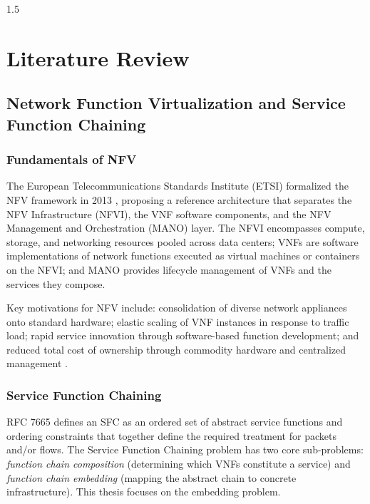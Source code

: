 \documentclass[A4paper,12pt]{report}
\theoremstyle{plain}
\theoremstyle{definition}
\theoremstyle{remark}
\numberwithin{equation}{section}
\begin{document}
\begin{spacing}{1.5}
\chapter{Literature Review}

\section{Network Function Virtualization and Service Function Chaining}

\subsection{Fundamentals of NFV}

The European Telecommunications Standards Institute (ETSI) formalized the NFV framework in 2013 \cite{etsi2013}, proposing a reference architecture that separates the NFV Infrastructure (NFVI), the VNF software components, and the NFV Management and Orchestration (MANO) layer. The NFVI encompasses compute, storage, and networking resources pooled across data centers; VNFs are software implementations of network functions executed as virtual machines or containers on the NFVI; and MANO provides lifecycle management of VNFs and the services they compose.

Key motivations for NFV include: consolidation of diverse network appliances onto standard hardware; elastic scaling of VNF instances in response to traffic load; rapid service innovation through software-based function development; and reduced total cost of ownership through commodity hardware and centralized management \cite{mijumbi2016}.

\subsection{Service Function Chaining}

RFC 7665 \cite{halpern2015} defines an SFC as an ordered set of abstract service functions and ordering constraints that together define the required treatment for packets and/or flows. The Service Function Chaining problem has two core sub-problems: \textit{function chain composition} (determining which VNFs constitute a service) and \textit{function chain embedding} (mapping the abstract chain to concrete infrastructure). This thesis focuses on the embedding problem.


\end{spacing}
\end{document}
